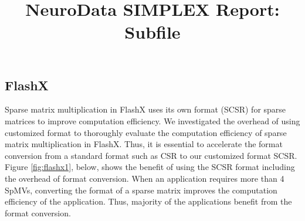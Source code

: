 \documentclass[simplex.tex]{subfiles}
\title{NeuroData SIMPLEX Report: Subfile}
\begin{document}


\subsection{FlashX}

Sparse matrix multiplication in FlashX uses its own format (SCSR) for sparse
matrices to improve computation efficiency. We investigated the overhead of
using customized format to thoroughly evaluate the computation efficiency of
sparse matrix multiplication in FlashX. Thus, it is essential to accelerate the
format conversion from a standard format such as CSR to our customized
format SCSR. Figure \ref{fig:flashx1}, below, shows the benefit of using
the SCSR format including the overhead of format conversion. When an
application requires more than 4 SpMVs, converting the format of a
sparse matrix improves the computation efficiency of the application. Thus,
majority of the applications benefit from the format conversion.
\end{document}
